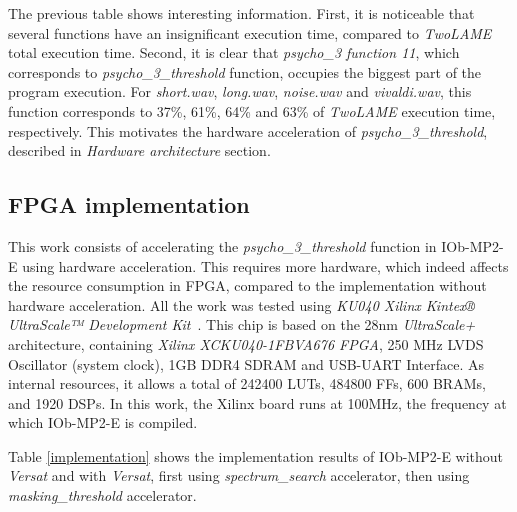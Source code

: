 The previous table shows interesting information. First, it is noticeable that several functions have an insignificant execution time, compared to \textit{TwoLAME} total execution time. Second, it is clear that \textit{psycho\_3 function 11}, which corresponds to \textit{psycho\_3\_threshold} function, occupies the biggest part of the program execution. For \textit{short.wav}, \textit{long.wav}, \textit{noise.wav} and \textit{vivaldi.wav}, this function corresponds to 37\%, 61\%, 64\% and 63\% of \textit{TwoLAME} execution time, respectively.
This motivates the hardware acceleration of \textit{psycho\_3\_threshold}, described in \textit{Hardware architecture} section.

\subsection{FPGA implementation}
This work consists of accelerating the \textit{psycho\_3\_threshold} function in IOb-MP2-E using hardware acceleration. This requires more hardware, which indeed affects the resource consumption in FPGA, compared to the implementation without hardware acceleration.
All the work was tested using \textit{KU040 Xilinx Kintex® UltraScale™ Development Kit}~\cite{bib:xcku040}. This chip is based on the 28nm \textit{UltraScale+} architecture, containing \textit{Xilinx XCKU040-1FBVA676 FPGA}, 250 MHz LVDS Oscillator (system clock), 1GB DDR4 SDRAM and USB-UART Interface. As internal resources, it allows a total of 242400 LUTs, 484800 FFs, 600 BRAMs, and 1920 DSPs.
In this work, the Xilinx board runs at 100MHz, the frequency at which IOb-MP2-E is compiled. 

Table \ref{implementation} shows the implementation results of IOb-MP2-E without \textit{Versat} and with \textit{Versat}, first using \textit{spectrum\_search} accelerator, then using \textit{masking\_threshold} accelerator.

\vspace{0.5cm}


